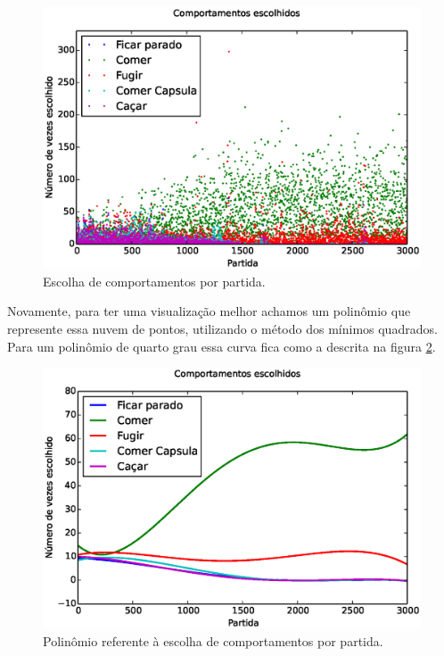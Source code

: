 \begin{figure}[H]
    \centering
    \includegraphics[width=\linewidth]{images/5_behaviors_small_map/chosen_behaviors}
    \caption{Escolha de comportamentos por partida.}
    \label{img:5ComportamentosMapaPequeno:ComportamentosEscolhidos}
\end{figure}

Novamente, para ter uma visualização melhor achamos um polinômio que represente essa nuvem de pontos, utilizando o método dos mínimos quadrados. Para um polinômio de quarto grau essa curva fica como a descrita na figura \ref{img:5ComportamentosMapaPequeno:ComportamentosEscolhidosPolinômio}.

\begin{figure}[H]
    \centering
    \includegraphics[width=\linewidth]{images/5_behaviors_small_map/chosen_behaviors_pol}
    \caption{Polinômio referente à escolha de comportamentos por partida.}
    \label{img:5ComportamentosMapaPequeno:ComportamentosEscolhidosPolinômio}
\end{figure}

